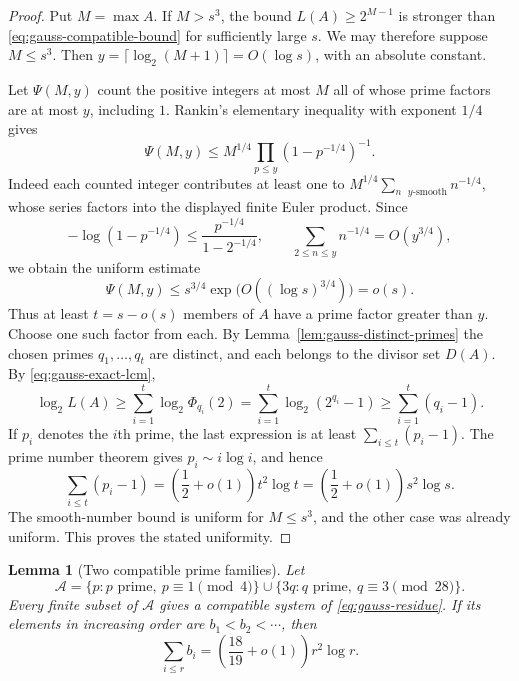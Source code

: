 \documentclass[11pt,a4paper]{article}
\newtheorem{lemma}[theorem]{Lemma}
\theoremstyle{definition}
\theoremstyle{remark}\newtheorem{remark}[theorem]{Remark}
\begin{document}
\begin{proof}
Put $M=\max A$.  If $M>s^3$, the bound $L(A)\geq2^{M-1}$ is
stronger than \eqref{eq:gauss-compatible-bound} for sufficiently
large $s$.  We may therefore suppose $M\leq s^3$.  Then
$y=\lceil\log_2(M+1)\rceil=O(\log s)$, with an absolute constant.

Let $\Psi(M,y)$ count the positive integers at most $M$ all of whose
prime factors are at most $y$, including $1$.  Rankin's elementary
inequality with exponent $1/4$ gives
\[
 \Psi(M,y)\leq M^{1/4}
 \prod_{p\leq y}(1-p^{-1/4})^{-1}.
\]
Indeed each counted integer contributes at least one to
$M^{1/4}\sum_{n\text{ $y$-smooth}}n^{-1/4}$, whose series factors
into the displayed finite Euler product.  Since
\[
 -\log(1-p^{-1/4})
 \leq\frac{p^{-1/4}}{1-2^{-1/4}},\qquad
 \sum_{2\leq n\leq y}n^{-1/4}=O(y^{3/4}),
\]
we obtain the uniform estimate
\[
 \Psi(M,y)\leq s^{3/4}\exp\bigl(O((\log s)^{3/4})\bigr)=o(s).
\]
Thus at least $t=s-o(s)$ members of $A$ have a prime factor greater
than $y$.  Choose one such factor from each.  By
Lemma~\ref{lem:gauss-distinct-primes} the chosen primes
$q_1,\ldots,q_t$ are distinct, and each belongs to the divisor set
$D(A)$.  By \eqref{eq:gauss-exact-lcm},
\[
 \log_2L(A)\geq\sum_{i=1}^t\log_2\Phi_{q_i}(2)
 =\sum_{i=1}^t\log_2(2^{q_i}-1)
 \geq\sum_{i=1}^t(q_i-1).
\]
If $p_i$ denotes the $i$th prime, the last expression is at least
$\sum_{i\leq t}(p_i-1)$.  The prime number theorem gives
$p_i\sim i\log i$, and hence
\[
 \sum_{i\leq t}(p_i-1)
 =\left(\frac12+o(1)\right)t^2\log t
 =\left(\frac12+o(1)\right)s^2\log s.
\]
The smooth-number bound is uniform for $M\leq s^3$, and the other
case was already uniform.  This proves the stated uniformity.
\end{proof}

\begin{lemma}[Two compatible prime families]
\label{lem:gauss-mixed-primes}
Let
\[
 \mathcal A=
 \{p:p\text{ prime},\ p\equiv1\pmod4\}
 \mathbin{\cup}
 \{3q:q\text{ prime},\ q\equiv3\pmod{28}\}.
\]
Every finite subset of $\mathcal A$ gives a compatible system of
\eqref{eq:gauss-residue}.  If its elements in increasing order are
$b_1<b_2<\cdots$, then
\begin{equation}\label{eq:gauss-mixed-sum}
 \sum_{i\leq r}b_i=\left(\frac{18}{19}+o(1)\right)r^2\log r.
\end{equation}
\end{lemma}
\end{document}
